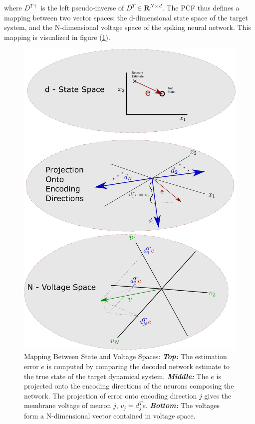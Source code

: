\begin{enumerate}
where $D^{T \dagger}$ is the left pseudo-inverse of $D^T \in \mathbf{R}^{N \times d}$. The PCF thus defines a mapping between two vector spaces: the d-dimensional state space of the target system, and the N-dimensional voltage space of the spiking neural network. This mapping is visualized in figure (\ref{fig:derivation:basic_model:pcf_e_v_map}). 
\begin{figure}
    \centering
    \includegraphics[scale=.703]{figures/pcf_e_v_graphic.pdf}
    \caption{Mapping Between State and Voltage Spaces: \textbf{\textit{Top:}} The estimation error $e$ is computed by comparing the decoded network estimate to the true state of the target dynamical system.  \textbf{\textit{Middle:}} The $e$ is projected onto the encoding directions of the neurons composing the network. The projection of error onto encoding direction $j$ gives the membrane voltage of neuron $j$, $v_j = d_j^T e$. \textbf{\textit{Bottom:}} The voltages form a N-dimensional vector contained in voltage space.}
    \label{fig:derivation:basic_model:pcf_e_v_map}
\end{figure}

\end{enumerate}

